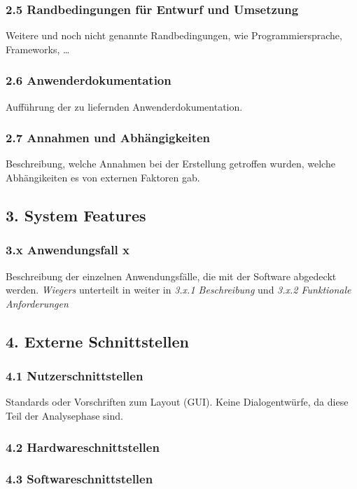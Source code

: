 \subsubsection*{2.5 Randbedingungen für Entwurf und Umsetzung}
Weitere und noch nicht genannte Randbedingungen, wie Programmiersprache, Frameworks, \ldots

\subsubsection*{2.6 Anwenderdokumentation}
Aufführung der zu liefernden Anwenderdokumentation.

\subsubsection*{2.7 Annahmen und Abhängigkeiten}
Beschreibung, welche Annahmen bei der Erstellung getroffen wurden, welche Abhängikeiten es von externen Faktoren gab.


\subsection*{3. System Features}

\subsubsection*{3.x Anwendungsfall x}
Beschreibung der einzelnen Anwendungsfälle, die mit der Software abgedeckt werden. \textit{Wiegers} unterteilt in \cite[194]{WJ13} weiter in \textit{3.x.1 Beschreibung} und \textit{3.x.2 Funktionale Anforderungen}

\subsection*{4. Externe Schnittstellen}

\subsubsection*{4.1 Nutzerschnittstellen}
Standards oder Vorschriften zum Layout (GUI).
Keine Dialogentwürfe, da diese Teil der Analysephase sind.

\subsubsection*{4.2 Hardwareschnittstellen}

\subsubsection*{4.3 Softwareschnittstellen}

